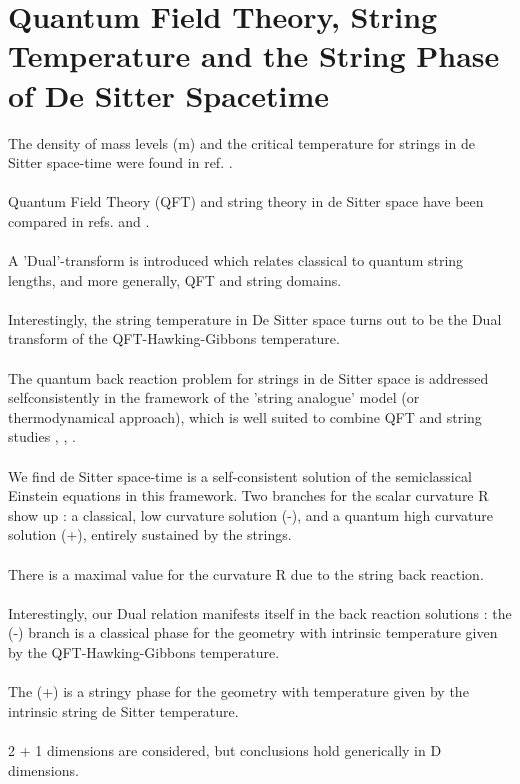 \documentclass[12pt,a4paper]{article}
\begin{document}
\section{Quantum Field Theory, String Temperature and the String Phase of 
De Sitter Spacetime}
The density of mass levels \myHighlight{${\bf \rho}$}\coordHE{}(m) and the critical temperature 
for strings in de Sitter space-time were found in ref. \cite{ms1}.\\ \\
Quantum Field Theory (QFT) and string theory in de Sitter space have been 
compared in refs. \cite{ms1} and \cite{ms3}.\\ \\
A 'Dual'-transform is introduced which relates classical to quantum string 
lengths, and more generally, QFT and string domains.\\ \\
Interestingly, the string temperature in De Sitter space turns out to be the 
Dual transform of the QFT-Hawking-Gibbons temperature.\\ \\
The quantum back reaction problem for strings in de Sitter space is addressed 
selfconsistently in the framework of the 'string analogue' model (or 
thermodynamical approach), which is well suited to combine QFT and string 
studies \cite{ms1}, \cite{ms2}, \cite{ms3}.\\ \\
We find de Sitter space-time is a self-consistent solution of the semiclassical Einstein equations in this framework. Two branches for the scalar curvature 
R\myHighlight{$_{(\pm)}$}\coordHE{} show up : a classical, low curvature solution (-), and a quantum 
high curvature solution (+), entirely sustained by the strings. \\ \\
There is a maximal value for the curvature R\coordHE{} due to the 
string back reaction.\\ \\
Interestingly, our Dual relation manifests itself in the back reaction 
solutions : the (-) branch is a classical phase for the geometry with intrinsic temperature given by the QFT-Hawking-Gibbons temperature.\\ \\
The (+) is a stringy phase for the geometry with temperature given by the 
intrinsic string de Sitter temperature.\\ \\
2 + 1 dimensions are considered, but conclusions hold generically in D 
dimensions.\\
\end{document}
